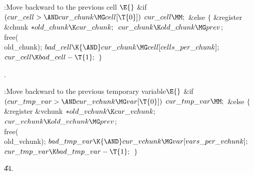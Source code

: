 \B{}:Move  backward to the previous cell%
\X${}\E{}$\6
\&{if} ${}(\\{cur\_cell}>{\AND}\\{cur\_chunk}\MG\\{cell}[\T{0}]){}$\1\5
${}\\{cur\_cell}\MM;{}$\2\6
\&{else}\5
${}\{{}$\1\6
\&{register} \&{chunk} ${}{*}\\{old\_chunk}\K\\{cur\_chunk};{}$\7
${}\\{cur\_chunk}\K\\{old\_chunk}\MG\\{prev}{}$;\5
\\{free}(\\{old\_chunk});\6
${}\\{bad\_cell}\K{\AND}\\{cur\_chunk}\MG\\{cell}[\\{cells\_per\_chunk}];{}$\6
${}\\{cur\_cell}\K\\{bad\_cell}-\T{1};{}$\6
\4${}\}{}$\2\par
{}.\fi

\B{}:Move  backward to the previous
temporary variable\X${}\E{}$\6
\&{if} ${}(\\{cur\_tmp\_var}>{\AND}\\{cur\_vchunk}\MG\\{var}[\T{0}]){}$\1\5
${}\\{cur\_tmp\_var}\MM;{}$\2\6
\&{else}\5
${}\{{}$\1\6
\&{register} \&{vchunk} ${}{*}\\{old\_vchunk}\K\\{cur\_vchunk};{}$\7
${}\\{cur\_vchunk}\K\\{old\_vchunk}\MG\\{prev}{}$;\5
\\{free}(\\{old\_vchunk});\6
${}\\{bad\_tmp\_var}\K{\AND}\\{cur\_vchunk}\MG\\{var}[\\{vars\_per%
\_vchunk}];{}$\6
${}\\{cur\_tmp\_var}\K\\{bad\_tmp\_var}-\T{1};{}$\6
\4${}\}{}$\2\par
\U44.\fi

